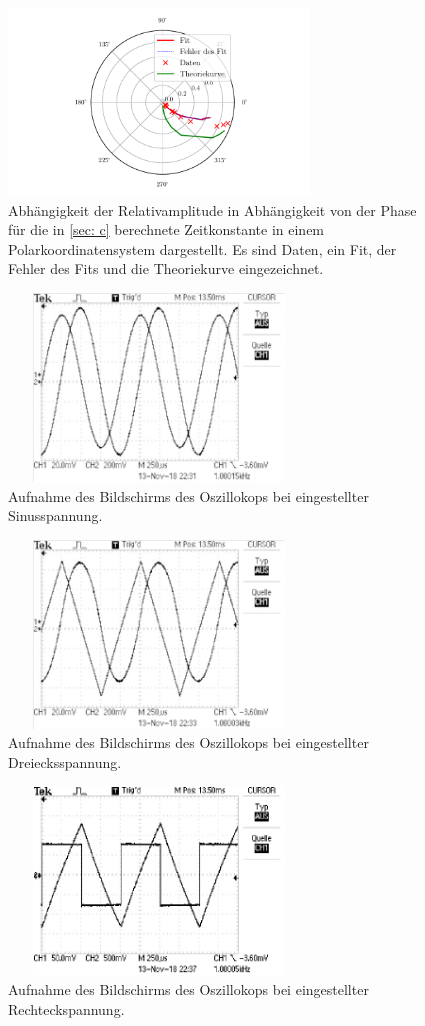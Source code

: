 \begin{figure}
  \centering
  \includegraphics[width=8cm, height=5cm]{build/plotd3.pdf}
  \caption{Abhängigkeit der Relativamplitude in Abhängigkeit von der Phase für die in \ref{sec: c} 
  berechnete Zeitkonstante in einem Polarkoordinatensystem dargestellt. Es sind Daten, ein Fit, der Fehler
  des Fits und die Theoriekurve eingezeichnet.}
  \label{fig: plotd3}
\end{figure}

\begin{figure}
  \centering
  \includegraphics[width=8cm, height=5cm]{build/integrator1.pdf}
  \caption{Aufnahme des Bildschirms des Oszillokops bei eingestellter Sinusspannung.}
  \label{fig: sinus}
\end{figure}

\begin{figure}
  \centering
  \includegraphics[width=8cm, height=5cm]{build/integrator2.pdf}
  \caption{Aufnahme des Bildschirms des Oszillokops bei eingestellter Dreiecksspannung.}
  \label{fig: dreieck}
\end{figure}

\begin{figure}
  \centering
  \includegraphics[width=8cm, height=5cm]{build/integrator3.pdf}
  \caption{Aufnahme des Bildschirms des Oszillokops bei eingestellter Rechteckspannung.}
  \label{fig: rechteck}
\end{figure}
